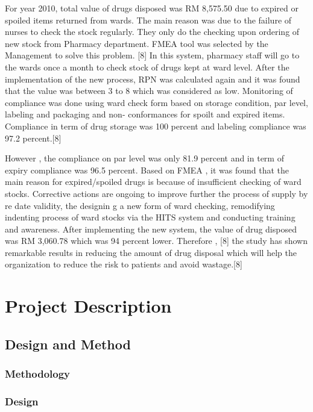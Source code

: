 \documentclass[12pt, a4paper]{report}
\begin{document}
For year 2010, total value of drugs disposed was RM 8,575.50 due to expired or spoiled items returned from wards. The main reason was due to the failure of nurses to check the stock regularly. They only do the checking upon ordering of new stock from Pharmacy department. FMEA tool was selected by the Management to solve this problem. [8] In this system, pharmacy staff will go to the wards once a month to check stock of drugs kept at ward level. After the implementation of the new process, RPN was calculated again and it was found that the value was between 3 to 8 which was considered as low. Monitoring of compliance was done using ward check form based on storage condition, par level, labeling and packaging and non- conformances for spoilt and expired items. Compliance in term of drug storage was 100 percent and labeling compliance was 97.2 percent.[8]  

However , the  compliance  on  par  level  was  only  81.9 percent  and  in  term  of  expiry compliance  was  96.5 percent.  Based  on  FMEA  ,  it  was  found  that  the  main  reason  for  expired/spoiled drugs  is  because  of  insufficient  checking  of  ward  stocks.  Corrective  actions  are  ongoing  to improve  further  the  process  of  supply  by  re date  validity,  the designin g  a  new  form  of  ward  checking,  remodifying  indenting  process  of  ward  stocks  via  the  HITS  system  and  conducting  training  and awareness.  After  implementing  the  new  system,  the  value  of  drug  disposed  was  RM  3,060.78 which  was  94 percent lower.  Therefore , [8] the  study has  shown  remarkable  results  in  reducing  the amount  of  drug  disposal  which  will  help  the  organization  to  reduce  the  risk  to  patients  and avoid wastage.[8] 
\newpage


 \chapter{Project Description}

\section{Design and Method}

\subsection{Methodology}

\subsection{Design}
\end{document}
